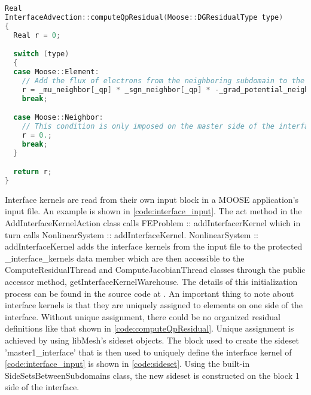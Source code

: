 \begin{lstlisting}[language = C++, caption = InterfaceAdvection::computeQpResidual method, label = code:computeQpResidual]
Real
InterfaceAdvection::computeQpResidual(Moose::DGResidualType type)
{
  Real r = 0;

  switch (type)
  {
  case Moose::Element:
    // Add the flux of electrons from the neighboring subdomain to the balance equation for electrons in the current subdomain
    r = _mu_neighbor[_qp] * _sgn_neighbor[_qp] * -_grad_potential_neighbor[_qp] * _r_neighbor_units * std::exp(_neighbor_value[_qp]) * _normals[_qp] * _test[_i][_qp] * _r_units;
    break;

  case Moose::Neighbor:
    // This condition is only imposed on the master side of the interface, thus we do not add any residual contribution to the neighboring side
    r = 0.;
    break;
  }

  return r;
}
\end{lstlisting}

Interface kernels are read from their own input block in a MOOSE application's input file. An example is shown in \cref{code:interface_input}. The act method in the AddInterfaceKernelAction class calls FEProblem :: addInterfacerKernel which in turn calls NonlinearSystem :: addInterfaceKernel. NonlinearSystem :: addInterfaceKernel adds the interface kernels from the input file to the protected \_interface\_kernels data member which are then accessible to the ComputeResidualThread and ComputeJacobianThread classes through the public accessor method, getInterfaceKernelWarehouse. The details of this initialization process can be found in the source code at \cite{mooseSite}. An important thing to note about interface kernels is that they are uniquely assigned to elements on one side of the interface. Without unique assignment, there could be no organized residual definitions like that shown in \cref{code:computeQpResidual}. Unique assignment is achieved by using libMesh's sideset objects. The block used to create the sideset 'master1\_interface' that is then used to uniquely define the interface kernel of \cref{code:interface_input} is shown in \cref{code:sideset}. Using the built-in SideSetsBetweenSubdomains class, the new sideset is constructed on the block 1 side of the interface.

